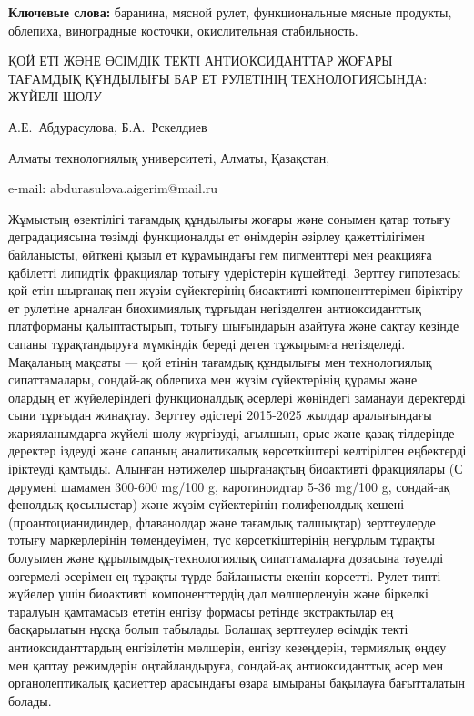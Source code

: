 {\bfseries Ключевые слова:} баранина, мясной рулет, функциональные мясные
продукты, облепиха, виноградные косточки, окислительная стабильность.

\begin{header}
ҚОЙ ЕТІ ЖӘНЕ ӨСІМДІК ТЕКТІ АНТИОКСИДАНТТАР ЖОҒАРЫ ТАҒАМДЫҚ ҚҰНДЫЛЫҒЫ БАР ЕТ РУЛЕТІНІҢ ТЕХНОЛОГИЯСЫНДА: ЖҮЙЕЛІ ШОЛУ

А.Е.~Абдурасулова\envelope,
Б.А.~Рскелдиев
\end{header}

\begin{affil}
Алматы технологиялық университеті, Алматы, Қазақстан,

e-mail: abdurasulova.aigerim@mail.ru
\end{affil}

Жұмыстың өзектілігі тағамдық құндылығы жоғары және сонымен қатар тотығу
деградациясына төзімді функционалды ет өнімдерін әзірлеу қажеттілігімен
байланысты, өйткені қызыл ет құрамындағы гем пигменттері мен реакцияға
қабілетті липидтік фракциялар тотығу үдерістерін күшейтеді. Зерттеу
гипотезасы қой етін шырғанақ пен жүзім сүйектерінің биоактивті
компоненттерімен біріктіру ет рулетіне арналған биохимиялық тұрғыдан
негізделген антиоксиданттық платформаны қалыптастырып, тотығу шығындарын
азайтуға және сақтау кезінде сапаны тұрақтандыруға мүмкіндік береді
деген тұжырымға негізделеді. Мақаланың мақсаты --- қой етінің тағамдық
құндылығы мен технологиялық сипаттамалары, сондай-ақ облепиха мен жүзім
сүйектерінің құрамы және олардың ет жүйелеріндегі функционалдық әсерлері
жөніндегі заманауи деректерді сыни тұрғыдан жинақтау. Зерттеу әдістері
2015-2025 жылдар аралығындағы жарияланымдарға жүйелі шолу жүргізуді,
ағылшын, орыс және қазақ тілдерінде деректер іздеуді және сапаның
аналитикалық көрсеткіштері келтірілген еңбектерді іріктеуді қамтыды.
Алынған нәтижелер шырғанақтың биоактивті фракциялары (С дәрумені шамамен
300-600 mg/100 g, каротиноидтар 5-36 mg/100 g, сондай-ақ фенолдық
қосылыстар) және жүзім сүйектерінің полифенолдық кешені
(проантоцианидиндер, флаванолдар және тағамдық талшықтар) зерттеулерде
тотығу маркерлерінің төмендеуімен, түс көрсеткіштерінің неғұрлым тұрақты
болуымен және құрылымдық-технологиялық сипаттамаларға дозасына тәуелді
өзгермелі әсерімен ең тұрақты түрде байланысты екенін көрсетті. Рулет
типті жүйелер үшін биоактивті компоненттердің дәл мөлшерленуін және
біркелкі таралуын қамтамасыз ететін енгізу формасы ретінде экстрактылар
ең басқарылатын нұсқа болып табылады. Болашақ зерттеулер өсімдік текті
антиоксиданттардың енгізілетін мөлшерін, енгізу кезеңдерін, термиялық
өңдеу мен қаптау режимдерін оңтайландыруға, сондай-ақ антиоксиданттық
әсер мен органолептикалық қасиеттер арасындағы өзара ымыраны бақылауға
бағытталатын болады.

